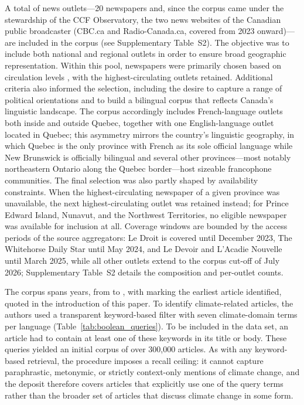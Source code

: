 \documentclass[12pt]{article}
\renewcommand\_{\texttt{\detokenize{_}\allowbreak}}
\begin{document}
A total of \CCFnewspapers{} news outlets---20 newspapers and, since the corpus came under the stewardship of the CCF Observatory, the two news websites of the Canadian public broadcaster (CBC.ca and Radio-Canada.ca, covered from 2023 onward)---are included in the corpus (see Supplementary Table~S2). The objective was to include both national and regional outlets in order to ensure broad geographic representation. Within this pool, newspapers were primarily chosen based on circulation levels \autocite{newspapers_canada_circulation_2015}, with the highest-circulating outlets retained. Additional criteria also informed the selection, including the desire to capture a range of political orientations and to build a bilingual corpus that reflects Canada's linguistic landscape. The corpus accordingly includes French-language outlets both inside and outside Quebec, together with one English-language outlet located in Quebec; this asymmetry mirrors the country's linguistic geography, in which Quebec is the only province with French as its sole official language while New Brunswick is officially bilingual and several other provinces---most notably northeastern Ontario along the Quebec border---host sizeable francophone communities. The final selection was also partly shaped by availability constraints. When the highest-circulating newspaper of a given province was unavailable, the next highest-circulating outlet was retained instead; for Prince Edward Island, Nunavut, and the Northwest Territories, no eligible newspaper was available for inclusion at all. Coverage windows are bounded by the access periods of the source aggregators: Le Droit is covered until December 2023, The Whitehorse Daily Star until May 2024, and Le Devoir and L'Acadie Nouvelle until March 2025, while all other outlets extend to the corpus cut-off of July 2026; Supplementary Table~S2 details the composition and per-outlet counts.

The corpus spans \CCFnyears{} years, from \CCFyearfirst{} to \CCFyearlast{}, with \CCFyearfirst{} marking the earliest article identified, quoted in the introduction of this paper. To identify climate-related articles, the authors used a transparent keyword-based filter with seven climate-domain terms per language (Table~\ref{tab:boolean_queries}). To be included in the data set, an article had to contain at least one of these keywords in its title or body. These queries yielded an initial corpus of over 300,000 articles. As with any keyword-based retrieval, the procedure imposes a recall ceiling: it cannot capture paraphrastic, metonymic, or strictly context-only mentions of climate change, and the deposit therefore covers articles that explicitly use one of the query terms rather than the broader set of articles that discuss climate change in some form. 
\end{document}
